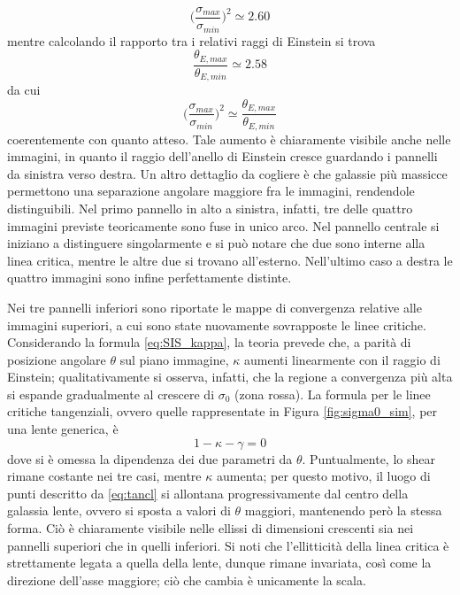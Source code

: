 \begin{equation}
    \Big(\frac{\sigma_{max}}{\sigma_{min}}\Big)^2 \simeq 2.60
\end{equation}
mentre calcolando il rapporto tra i relativi raggi di Einstein si trova
\begin{equation}
    \frac{\theta_{E,max}}{\theta_{E,min}}\simeq2.58
\end{equation}
da cui 
\begin{equation}
     \Big(\frac{\sigma_{max}}{\sigma_{min}}\Big)^2 \simeq \frac{\theta_{E,max}}{\theta_{E,min}}
\end{equation}
coerentemente con quanto atteso.
Tale aumento è chiaramente visibile anche nelle immagini, in quanto il raggio dell'anello di Einstein cresce guardando i pannelli da sinistra verso destra. 
Un altro dettaglio da cogliere è che galassie più massicce permettono una separazione angolare maggiore fra le immagini, rendendole distinguibili.
Nel primo pannello in alto a sinistra, infatti, tre delle quattro immagini previste teoricamente sono fuse in unico arco. Nel pannello centrale si iniziano a distinguere singolarmente e si può notare che due sono interne alla linea critica, mentre le altre due si trovano all'esterno. Nell'ultimo caso a destra le quattro immagini sono infine perfettamente distinte.

Nei tre pannelli inferiori sono riportate le mappe di convergenza relative alle immagini superiori, a cui sono state nuovamente sovrapposte le linee critiche. 
Considerando la formula \ref{eq:SIS_kappa}, la teoria prevede che, a parità di posizione angolare $\theta$ sul piano immagine, $\kappa$ aumenti linearmente con il raggio di Einstein; qualitativamente si osserva, infatti, che la regione a convergenza più alta si espande gradualmente al crescere di $\sigma_0$ (zona rossa).
La formula per le linee critiche tangenziali, ovvero quelle rappresentate in Figura \ref{fig:sigma0_sim}, per una lente generica, è 
\begin{equation}
     1-\kappa-\gamma =0
     \label{eq:tancl}
\end{equation}
dove si è omessa la dipendenza dei due parametri da $\theta$. Puntualmente, lo shear rimane costante nei tre casi, mentre $\kappa$ aumenta; per questo motivo, il luogo di punti  descritto da \ref{eq:tancl} si allontana progressivamente dal centro della galassia lente, ovvero si sposta a valori di $\theta$ maggiori, mantenendo però la stessa forma. Ciò è chiaramente visibile nelle ellissi di dimensioni crescenti sia nei pannelli superiori che in quelli inferiori. Si noti che l'ellitticità della linea critica è strettamente legata a quella della lente, dunque rimane invariata, così come la direzione dell'asse maggiore; ciò che cambia è unicamente la scala.
